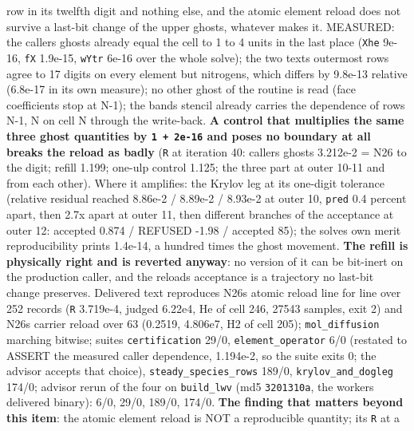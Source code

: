 \documentclass[english,a4paper]{my_memo}
\begin{document}
\begin{itemize}
{  row in its twelfth digit and nothing else, and the atomic element reload
  does not survive a last-bit change of the upper ghosts, whatever makes
  it.} MEASURED: the caller\textquotesingle s ghosts already equal the cell to 1 to 4 units
  in the last place (\texttt{Xhe} 9e-16, \texttt{fX} 1.9e-15, \texttt{wYtr} 6e-16 over the whole
  solve); the two texts\textquotesingle{} outermost rows agree to 17 digits on every element
  but nitrogen\textquotesingle s, which differs by 9.8e-13 relative (6.8e-17 in its own
  measure); no other ghost of the routine is read (face coefficients stop at
  N-1); the band\textquotesingle s stencil already carries the dependence of rows N-1, N on
  cell N through the write-back. \textbf{A control that multiplies the same three
  ghost quantities by \texttt{1\ +\ 2e-16} and poses no boundary at all breaks the reload
  as badly} (\texttt{\textbar{}\textbar{}R\textbar{}\textbar{}} at iteration 40: caller\textquotesingle s ghosts 3.212e-2 = N26 to the
  digit; refill 1.199; one-ulp control 1.125; the three part at outer 10-11
  and from each other). Where it amplifies: the Krylov leg at its one-digit
  tolerance (relative residual reached 8.86e-2 / 8.89e-2 / 8.93e-2 at outer
  10, \texttt{pred} 0.4 percent apart, then 2.7x apart at outer 11, then different
  branches of the acceptance at outer 12: accepted 0.874 / REFUSED -1.98 /
  accepted 85); the solve\textquotesingle s own merit reproducibility prints 1.4e-14, a
  hundred times the ghost movement. \textbf{The refill is physically right and is
  reverted anyway}: no version of it can be bit-inert on the production
  caller, and the reload\textquotesingle s acceptance is a trajectory no last-bit change
  preserves. Delivered text reproduces N26\textquotesingle s atomic reload line for line over
  252 records (\texttt{\textbar{}\textbar{}R\textbar{}\textbar{}} 3.719e-4, judged 6.22e4, He of cell 246, 27543
  samples, exit 2) and N26\textquotesingle s carrier reload over 63 (0.2519, 4.806e7, H2 of
  cell 205); \texttt{mol\_diffusion} marching bitwise; suites \texttt{certification} 29/0,
  \texttt{element\_operator} 6/0 (restated to ASSERT the measured caller dependence,
  1.194e-2, so the suite exits 0; the advisor accepts that choice),
  \texttt{steady\_species\_rows} 189/0, \texttt{krylov\_and\_dogleg} 174/0; advisor rerun of
  the four on \texttt{build\_lwv} (md5 \texttt{3201310a}, the worker\textquotesingle s delivered binary):
  6/0, 29/0, 189/0, 174/0. \textbf{The finding that matters beyond this item}:
  the atomic element reload is NOT a reproducible quantity; its \texttt{\textbar{}\textbar{}R\textbar{}\textbar{}} at a

\end{itemize}
\end{document}
